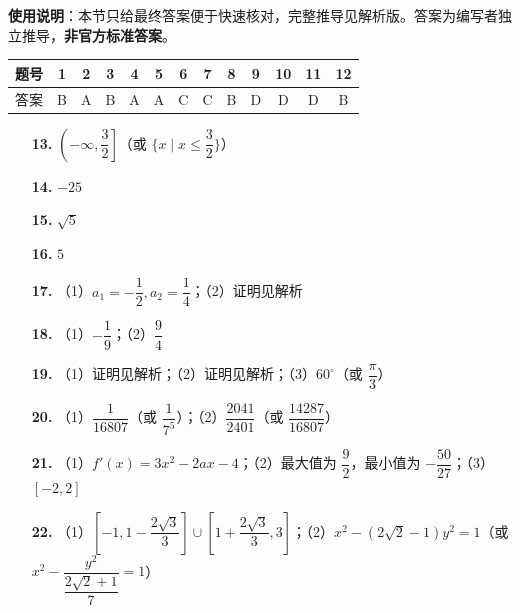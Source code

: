
\begin{gknotice}
\textbf{使用说明}：本节只给最终答案便于快速核对，完整推导见解析版。答案为编写者独立推导，\textbf{非官方标准答案}。
\end{gknotice}

\begin{center}\begin{tabular}{ccccccccccccc}
\toprule
题号 & 1 & 2 & 3 & 4 & 5 & 6 & 7 & 8 & 9 & 10 & 11 & 12 \\
\midrule
答案 & B & A & B & A & A & C & C & B & D & D & D & B \\
\bottomrule
\end{tabular}\end{center}

\begin{itemize}[leftmargin=2.6em]
  \item[\textbf{13.}] $\left(-\infty, \dfrac{3}{2}\right]$（或 $\{x \mid x \leqslant \dfrac{3}{2}\}$）
  \item[\textbf{14.}] $-25$
  \item[\textbf{15.}] $\sqrt{5}$
  \item[\textbf{16.}] $5$
\end{itemize}

\begin{itemize}[leftmargin=2.6em]
  \item[\textbf{17.}] （1）$a_1 = -\dfrac{1}{2}, a_2 = \dfrac{1}{4}$；（2）证明见解析
  \item[\textbf{18.}] （1）$-\dfrac{1}{9}$；（2）$\dfrac{9}{4}$
  \item[\textbf{19.}] （1）证明见解析；（2）证明见解析；（3）$60^\circ$（或 $\dfrac{\pi}{3}$）
  \item[\textbf{20.}] （1）$\dfrac{1}{16807}$（或 $\dfrac{1}{7^5}$）；（2）$\dfrac{2041}{2401}$（或 $\dfrac{14287}{16807}$）
  \item[\textbf{21.}] （1）$f'(x) = 3x^2 - 2ax - 4$；（2）最大值为 $\dfrac{9}{2}$，最小值为 $-\dfrac{50}{27}$；（3）$[-2, 2]$
  \item[\textbf{22.}] （1）$\left[-1, 1 - \dfrac{2\sqrt{3}}{3}\right] \cup \left[1 + \dfrac{2\sqrt{3}}{3}, 3\right]$；（2）$x^2 - (2\sqrt{2}-1)y^2 = 1$（或 $x^2 - \dfrac{y^2}{\dfrac{2\sqrt{2}+1}{7}} = 1$）
\end{itemize}
